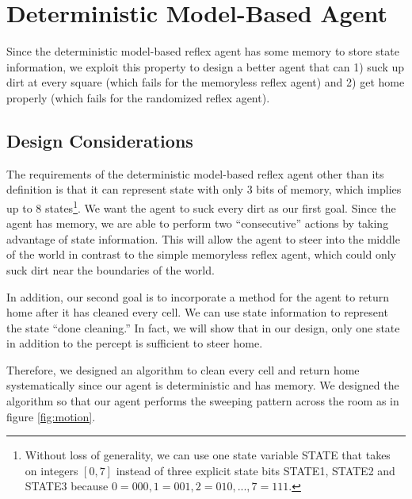 \section{Deterministic Model-Based Agent}

Since the deterministic model-based reflex agent has some memory to store state information, we exploit this property to design a better agent that can 1) suck up dirt at every square (which fails for the memoryless reflex agent) and 2) get home properly (which fails for the randomized reflex agent).

\subsection{Design Considerations}

The requirements of the deterministic model-based reflex agent other than its definition is that it can represent state with only 3 bits of memory, which implies up to 8 states\footnote{Without loss of generality, we can use one state variable STATE that takes on integers $[0, 7]$ instead of three explicit state bits STATE1, STATE2 and STATE3 because $0 = 000, 1 = 001, 2 = 010, ..., 7 = 111$.}. We want the agent to suck every dirt as our first goal. Since the agent has memory, we are able to perform two ``consecutive'' actions by taking advantage of state information. This will allow the agent to steer into the middle of the world in contrast to the simple memoryless reflex agent, which could only suck dirt near the boundaries of the world.

In addition, our second goal is to incorporate a method for the agent to return home after it has cleaned every cell. We can use state information to represent the state ``done cleaning.'' In fact, we will show that in our design, only one state in addition to the percept is sufficient to steer home.

Therefore, we designed an algorithm to clean every cell and return home systematically since our agent is deterministic and has memory. We designed the algorithm so that our agent performs the sweeping pattern across the room as in figure \ref{fig:motion}.

